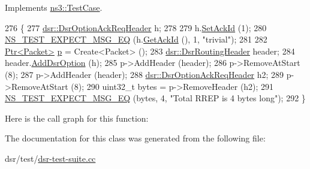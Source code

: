 Implements \hyperlink{classns3_1_1TestCase_a8ff74680cf017ed42011e4be51917a24}{ns3\+::\+Test\+Case}.


\begin{DoxyCode}
276 \{
277   \hyperlink{classns3_1_1dsr_1_1DsrOptionAckReqHeader}{dsr::DsrOptionAckReqHeader} h;
278 
279   h.\hyperlink{classns3_1_1dsr_1_1DsrOptionAckReqHeader_a8eb91c0ed78e98e83af9cfbeb553e48f}{SetAckId} (1);
280   \hyperlink{group__testing_ga7304ba46a28d8cf08dfdfd6499cf7068}{NS\_TEST\_EXPECT\_MSG\_EQ} (h.\hyperlink{classns3_1_1dsr_1_1DsrOptionAckReqHeader_ae6dacae0f5d8ccead95a456e9524d085}{GetAckId} (), 1, \textcolor{stringliteral}{"trivial"});
281 
282   \hyperlink{classns3_1_1Ptr}{Ptr<Packet>} \hyperlink{lte__link__budget_8m_ac9de518908a968428863f829398a4e62}{p} = Create<Packet> ();
283   \hyperlink{classns3_1_1dsr_1_1DsrRoutingHeader}{dsr::DsrRoutingHeader} header;
284   header.\hyperlink{classns3_1_1dsr_1_1DsrOptionField_acd03d07018e22f5e2b23975fae84fb3c}{AddDsrOption} (h);
285   p->AddHeader (header);
286   p->RemoveAtStart (8);
287   p->AddHeader (header);
288   \hyperlink{classns3_1_1dsr_1_1DsrOptionAckReqHeader}{dsr::DsrOptionAckReqHeader} h2;
289   p->RemoveAtStart (8);
290   uint32\_t bytes = p->RemoveHeader (h2);
291   \hyperlink{group__testing_ga7304ba46a28d8cf08dfdfd6499cf7068}{NS\_TEST\_EXPECT\_MSG\_EQ} (bytes, 4, \textcolor{stringliteral}{"Total RREP is 4 bytes long"});
292 \}
\end{DoxyCode}


Here is the call graph for this function\+:




The documentation for this class was generated from the following file\+:\begin{DoxyCompactItemize}
\item 
dsr/test/\hyperlink{dsr-test-suite_8cc}{dsr-\/test-\/suite.\+cc}\end{DoxyCompactItemize}
